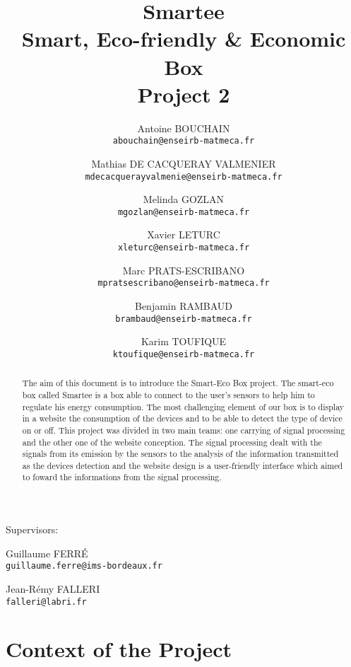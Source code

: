 \documentclass[10pt, english]{article}
\title{\Large{\bf{Smartee\\ Smart, Eco-friendly \& Economic Box\\ Project 2}}}
\author{
  \normalsize{Antoine BOUCHAIN} \\
 \small{\texttt{abouchain@enseirb-matmeca.fr}}
  \and
  \normalsize{Mathias DE CACQUERAY VALMENIER}\\
 \small{\texttt{mdecacquerayvalmenie@enseirb-matmeca.fr}}
    \and
    \normalsize{Melinda GOZLAN}\\
 \small{\texttt{mgozlan@enseirb-matmeca.fr}}
  \and
  \normalsize{Xavier LETURC}\\
  \small{\texttt{xleturc@enseirb-matmeca.fr}}
    \and
    \normalsize{Marc PRATS-ESCRIBANO}\\
  \small{\texttt{mpratsescribano@enseirb-matmeca.fr}}
  \and
  \normalsize{Benjamin RAMBAUD}\\
 \small{\texttt{brambaud@enseirb-matmeca.fr}}
  \and
  \normalsize{Karim TOUFIQUE}\\
  \small{\texttt{ktoufique@enseirb-matmeca.fr}}
}
\date{}
\begin{document}
\maketitle

\vspace{-20pt}
\begin{center}
Supervisors:\\
\vspace{5pt}
\begin{minipage}[c]{150pt}
\begin{center}
  \normalsize{Guillaume FERR\'{E}}\\
  \small{\texttt{guillaume.ferre@ims-bordeaux.fr}}
\end{center}
\end{minipage}
\hspace{20pt}
\begin{minipage}[c]{150pt}
\begin{center}
  \normalsize{Jean-R\'{e}my FALLERI}\\
  \small{\texttt{falleri@labri.fr}}
\end{center}
\end{minipage}
\end{center}




\vspace{10pt}

\begin{abstract}
\noindent The aim of this document is to introduce the Smart-Eco Box project. The smart-eco box called Smartee is a box able to connect to the user's sensors to help him to regulate his energy consumption. The most challenging element of our box is to display in a website the consumption of the devices and to be able to detect the type of device on or off.
This project was divided in two main teams: one carrying of signal processing and the other one of the website conception. The signal processing dealt with the signals from its emission by the sensors to the analysis of the information transmitted as the devices detection and the website design is a user-friendly interface which aimed to foward the informations from the signal processing.

\end{abstract}
\vspace{10pt}



\section{Context of the Project}
\end{document}
